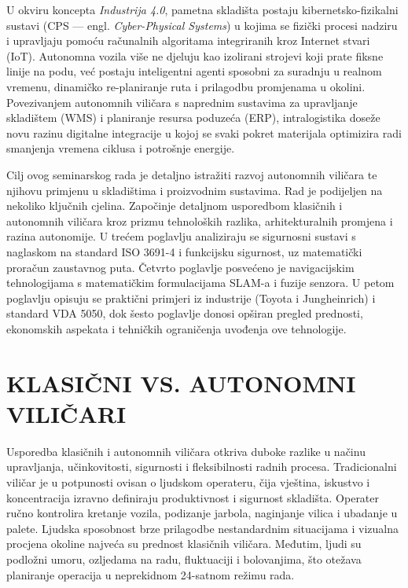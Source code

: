 \documentclass[12pt,a4paper]{article}
\begin{document}
U okviru koncepta \textit{Industrija 4.0}, pametna skladišta postaju kibernetsko-fizikalni sustavi (CPS — engl. \textit{Cyber-Physical Systems}) u kojima se fizički procesi nadziru i upravljaju pomoću računalnih algoritama integriranih kroz Internet stvari (IoT). Autonomna vozila više ne djeluju kao izolirani strojevi koji prate fiksne linije na podu, već postaju inteligentni agenti sposobni za suradnju u realnom vremenu, dinamičko re-planiranje ruta i prilagodbu promjenama u okolini. Povezivanjem autonomnih viličara s naprednim sustavima za upravljanje skladištem (WMS) i planiranje resursa poduzeća (ERP), intralogistika doseže novu razinu digitalne integracije u kojoj se svaki pokret materijala optimizira radi smanjenja vremena ciklusa i potrošnje energije.

Cilj ovog seminarskog rada je detaljno istražiti razvoj autonomnih viličara te njihovu primjenu u skladištima i proizvodnim sustavima. Rad je podijeljen na nekoliko ključnih cjelina. Započinje detaljnom usporedbom klasičnih i autonomnih viličara kroz prizmu tehnoloških razlika, arhitekturalnih promjena i razina autonomije. U trećem poglavlju analiziraju se sigurnosni sustavi s naglaskom na standard ISO 3691-4 i funkcijsku sigurnost, uz matematički proračun zaustavnog puta. Četvrto poglavlje posvećeno je navigacijskim tehnologijama s matematičkim formulacijama SLAM-a i fuzije senzora. U petom poglavlju opisuju se praktični primjeri iz industrije (Toyota i Jungheinrich) i standard VDA 5050, dok šesto poglavlje donosi opširan pregled prednosti, ekonomskih aspekata i tehničkih ograničenja uvođenja ove tehnologije.

\section{KLASIČNI VS. AUTONOMNI VILIČARI}
Usporedba klasičnih i autonomnih viličara otkriva duboke razlike u načinu upravljanja, učinkovitosti, sigurnosti i fleksibilnosti radnih procesa. Tradicionalni viličar je u potpunosti ovisan o ljudskom operateru, čija vještina, iskustvo i koncentracija izravno definiraju produktivnost i sigurnost skladišta. Operater ručno kontrolira kretanje vozila, podizanje jarbola, naginjanje vilica i ubadanje u palete. Ljudska sposobnost brze prilagodbe nestandardnim situacijama i vizualna procjena okoline najveća su prednost klasičnih viličara. Međutim, ljudi su podložni umoru, ozljedama na radu, fluktuaciji i bolovanjima, što otežava planiranje operacija u neprekidnom 24-satnom režimu rada.
\end{document}
